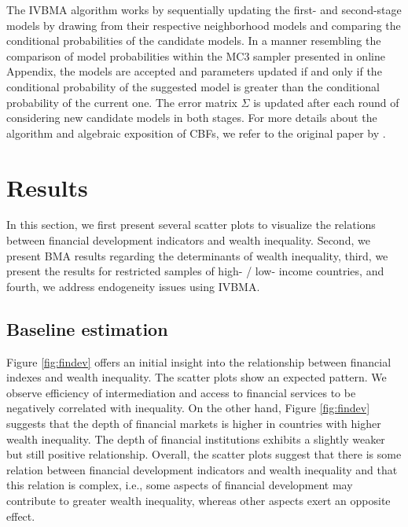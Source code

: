 \documentclass[a4paper,11pt]{article}
\begin{document}
The \ac{IVBMA} algorithm works by sequentially updating the first- and second-stage models by drawing from their respective neighborhood models and comparing the conditional probabilities of the candidate models. In a manner resembling the comparison of model probabilities within the MC3 sampler presented in online Appendix, the models are accepted and parameters updated if and only if the conditional probability of the suggested model is greater than the conditional probability of the current one. The error matrix $\Sigma$ is updated after each round of considering new candidate models in both stages. For more details about the algorithm and algebraic exposition of \acp{CBF}, we refer to the original paper by \cite{KarlLenkoski2012}.

%
%
%
%
%

\section{Results}
\label{sec:results}
In this section, we first present several scatter plots to visualize the relations between financial development indicators and wealth inequality. Second, we present \ac{BMA} results regarding the determinants of wealth inequality, third, we present the results for restricted samples of high- / low- income countries, and fourth, we address endogeneity issues using \ac{IVBMA}.

\subsection{Baseline estimation}
Figure \ref{fig:findev} offers an initial insight into the relationship between financial indexes and wealth inequality. The scatter plots show an expected pattern.  We observe efficiency of intermediation and access to financial services to be negatively correlated with inequality. On the other hand, Figure \ref{fig:findev} suggests that the depth of financial markets is higher in countries with higher wealth inequality. The depth of financial institutions exhibits a slightly weaker but still positive relationship. Overall, the scatter plots suggest that there is some relation between financial development indicators and wealth inequality and that this relation is complex, i.e., some aspects of financial development may contribute to greater wealth inequality, whereas other aspects exert an opposite effect.
\end{document}
